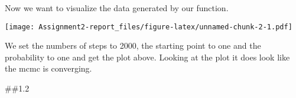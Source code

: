\documentclass[
]{article}
\newenvironment{Shaded}{\begin{snugshade}}{\end{snugshade}}
\newcommand{\AttributeTok}[1]{\textcolor[rgb]{0.77,0.63,0.00}{#1}}
\newcommand{\DecValTok}[1]{\textcolor[rgb]{0.00,0.00,0.81}{#1}}
\newcommand{\FunctionTok}[1]{\textcolor[rgb]{0.00,0.00,0.00}{#1}}
\newcommand{\NormalTok}[1]{#1}
\newcommand{\OtherTok}[1]{\textcolor[rgb]{0.56,0.35,0.01}{#1}}
\newcommand{\SpecialCharTok}[1]{\textcolor[rgb]{0.00,0.00,0.00}{#1}}
\begin{document}
Now we want to visualize the data generated by our function.

\begin{Shaded}
\end{Shaded}

\texttt{[image: Assignment2-report\_files/figure-latex/unnamed-chunk-2-1.pdf]}

We set the numbers of steps to 2000, the starting point to one and the
probability to one and get the plot above. Looking at the plot it does
look like the mcmc is converging.

\#\#1.2
\end{document}
